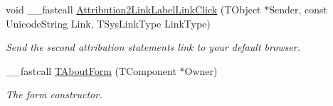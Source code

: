 \begin{DoxyCompactItemize}
void \+\_\+\+\_\+fastcall \mbox{\hyperlink{class_t_about_form_a16a26ef9958f3cdb5a0850f70d274e21}{Attribution2\+Link\+Label\+Link\+Click}} (T\+Object $\ast$Sender, const Unicode\+String Link, T\+Sys\+Link\+Type Link\+Type)
\begin{DoxyCompactList}\small\item\em Send the second attribution statement\textquotesingle{}s link to your default browser. \end{DoxyCompactList}\item 
\mbox{\label{class_t_about_form_a5f857ee166c84e44aa329cbf5e2b9400}} 
\+\_\+\+\_\+fastcall \mbox{\hyperlink{class_t_about_form_a5f857ee166c84e44aa329cbf5e2b9400}{T\+About\+Form}} (T\+Component $\ast$Owner)
\begin{DoxyCompactList}\small\item\em The form constructor. \end{DoxyCompactList}\end{DoxyCompactItemize}
